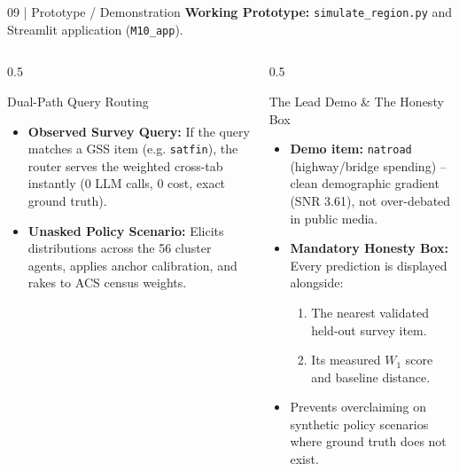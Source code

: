 \documentclass[10pt,aspectratio=169]{beamer}
\begin{document}
\begin{frame}{09 | Prototype / Demonstration}
    \small
    \textbf{Working Prototype:} \texttt{simulate\_region.py} and Streamlit application (\texttt{M10\_app}).

    \vspace{0.15cm}
    \begin{columns}[T]
        \begin{column}{0.5\textwidth}
            \begin{block}{Dual-Path Query Routing}
                \scriptsize
                \begin{itemize}\itemsep4pt
                    \item \textbf{Observed Survey Query:} If the query matches a GSS item (e.g. \texttt{satfin}), the router serves the weighted cross-tab instantly (0 LLM calls, 0 cost, exact ground truth).
                    \item \textbf{Unasked Policy Scenario:} Elicits distributions across the 56 cluster agents, applies anchor calibration, and rakes to ACS census weights.
                \end{itemize}
            \end{block}
        \end{column}
        \begin{column}{0.5\textwidth}
            \begin{block}{The Lead Demo \& The Honesty Box}
                \scriptsize
                \begin{itemize}\itemsep4pt
                    \item \textbf{Demo item:} \texttt{natroad} (highway/bridge spending) -- clean demographic gradient (SNR 3.61), not over-debated in public media.
                    \item \textbf{Mandatory Honesty Box:} Every prediction is displayed alongside:
                    \begin{enumerate}\tiny\itemsep1pt
                        \item The nearest validated held-out survey item.
                        \item Its measured $W_1$ score and baseline distance.
                    \end{enumerate}
                    \item Prevents overclaiming on synthetic policy scenarios where ground truth does not exist.
                \end{itemize}
            \end{block}
        \end{column}
    \end{columns}
\end{frame}
\end{document}
